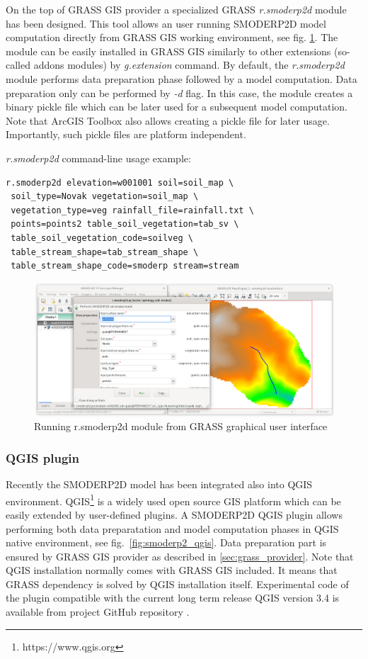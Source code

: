 On the top of GRASS GIS provider a specialized GRASS {\em r.smoderp2d}
module has been designed. This tool allows an user running SMODERP2D
model computation directly from GRASS GIS working environment, see
fig. \ref{fig:r.smoderp2d}. The module can be easily installed in
GRASS GIS similarly to other extensions (so-called addons modules) by
{\em g.extension} command. By default, the {\em r.smoderp2d} module
performs data preparation phase followed by a model computation. Data
preparation only can be performed by {\em -d} flag. In this case, the
module creates a binary pickle file which can be later used for a
subsequent model computation. Note that ArcGIS Toolbox also allows
creating a pickle file for later usage. Importantly, such pickle files
are platform independent.

{\em r.smoderp2d} command-line usage example:
\begin{verbatim}
r.smoderp2d elevation=w001001 soil=soil_map \
 soil_type=Novak vegetation=soil_map \
 vegetation_type=veg rainfall_file=rainfall.txt \
 points=points2 table_soil_vegetation=tab_sv \
 table_soil_vegetation_code=soilveg \
 table_stream_shape=tab_stream_shape \
 table_stream_shape_code=smoderp stream=stream 
\end{verbatim}

\begin{figure}[ht!]
  \begin{center}
    \includegraphics[width=1.0\columnwidth]{figures/smoderp2d_grass.png}
    \caption{Running r.smoderp2d module from GRASS graphical user interface}
    \label{fig:r.smoderp2d}
  \end{center}
\end{figure}

\subsubsection{QGIS plugin}
Recently the SMODERP2D model has been integrated also into QGIS
environment. QGIS\footnote{https://www.qgis.org} is a widely used open
source GIS platform which can be easily extended by user-defined
plugins. A SMODERP2D QGIS plugin allows performing both data
preparatation and model computation phases in QGIS native environment,
see fig.~\ref{fig:smoderp2_qgis}. Data preparation part is ensured by
GRASS GIS provider as described in \ref{sec:grass_provider}. Note that
QGIS installation normally comes with GRASS GIS included. It means
that GRASS dependency is solved by QGIS installation
itself. Experimental code of the plugin compatible with the current
long term release QGIS version 3.4 is available from project GitHub
repository \cite{smoderp2d-github-2019}.

